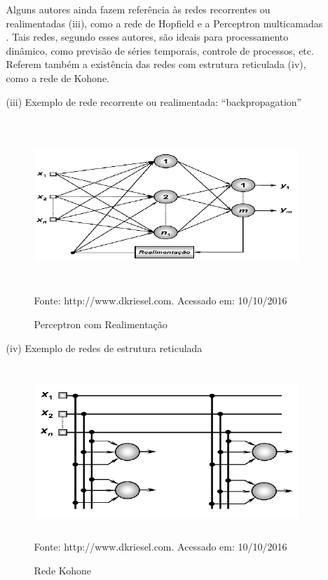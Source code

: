 \begin{itemize}
\begin{enumerate}
	      Alguns autores ainda fazem referência às redes recorrentes ou realimentadas (iii), 
	      como a rede de Hopfield e a Perceptron multicamadas \cite{Kriesel2007NeuralNetworks}. 
	      Tais redes, segundo esses autores, são ideais para processamento dinâmico, como previsão de 
	      séries temporais, controle de processos, etc.
	      Referem também a existência das redes com estrutura reticulada (iv), como a rede de Kohone.
	      \item [(iii)] Exemplo de rede recorrente ou realimentada: ``backpropagation''
	      \begin{figure}[!ht]
		\centering
		\caption{Perceptron com Realimentação}
		\vspace{1mm}
		  \includegraphics[width=100mm, height=65mm]{Figuras/Neural/Recorrentes.png}\\
		\tiny Fonte: http://www.dkriesel.com. Acessado em: 10/10/2016
	      \end{figure}  
	 
	      \item [(iv)] Exemplo de redes de estrutura reticulada
	      \begin{figure}[!ht]
		\centering
		\caption{Rede Kohone}
		\vspace{1mm}
		  \includegraphics[width=100mm, height=65mm]{Figuras/Neural/Kohone.png}\\
		\tiny Fonte: http://www.dkriesel.com. Acessado em: 10/10/2016
	      \end{figure}
	

\end{enumerate}
\end{itemize}
